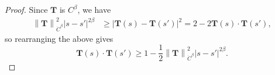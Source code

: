 \documentclass[reqno,centertags,12pt]{amsart}
\theoremstyle{definition}
\numberwithin{equation}{section}
\newcommand{\abs}[1]{\left\lvert#1\right\rvert}
\newcommand{\norm}[1]{\left\|#1\right\|}
\begin{document}
\begin{proof}
    Since $\mathbf{T}$ is $C^{\beta}$, we have
    \begin{align*}
        \norm{\mathbf{T}}_{\dot{C}^{\beta}}^{2}\abs{s - s'}^{2\beta}
        &\geq \abs{\mathbf{T}(s) - \mathbf{T}(s')}^{2}
        = 2 - 2\mathbf{T}(s)\cdot \mathbf{T}(s'),
    \end{align*}
    so rearranging the above gives
    \[
        \mathbf{T}(s)\cdot\mathbf{T}(s')
        \geq 1 - \frac{1}{2}\norm{\mathbf{T}}_{\dot{C}^{\beta}}^{2}\abs{s - s'}^{2\beta}.
    \]

\end{proof}
\end{document}
